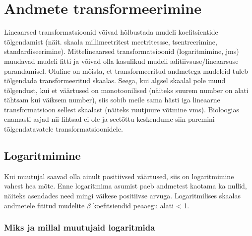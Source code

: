 \documentclass[]{book}
\begin{document}
\chapter{Andmete transformeerimine}\label{andmete-transformeerimine}

Lineaarsed transformatsioonid võivad hõlbustada mudeli koefitsientide
tõlgendamist (näit. skaala millimeetritest meetritessse, tsentreerimine,
standardiseerimine). Mittelineaarsed transformatsioonid (logaritmimine,
jms) muudavad mudeli fitti ja võivad olla kasulikud mudeli
aditiivsuse/lineaarsuse parandamisel. Oluline on mõista, et
transformeeritud andmetega mudeleid tuleb tõlgendada transformeeritud
skaalas. Seega, kui algsel skaalal pole muud tõlgendust, kui et
väärtused on monotoonilised (näiteks suurem number on alati tähtsam kui
väiksem number), siis sobib meile sama hästi iga lineaarne
transformatsioon sellest skaalast (näiteks ruutjuure võtmine vms).
Bioloogias enamasti asjad nii lihtsad ei ole ja seetõttu keskendume siin
paremini tõlgendatavatele transformatsioonidele.

\section{Logaritmimine}\label{logaritmimine}

Kui muutujal saavad olla ainult positiivsed väärtused, siis on
logaritmimine vahest hea mõte. Enne logaritmima asumist paeb andmetest
kaotama ka nullid, näiteks asendades need mingi väikese positiivse
arvuga. Logaritmilises skaalas andmetele fititud mudelite \(\beta\)
koefitsiendid peaaegu alati \textless{} 1.

\subsection*{Miks ja millal muutujaid
logaritmida}\label{miks-ja-millal-muutujaid-logaritmida}
\end{document}

